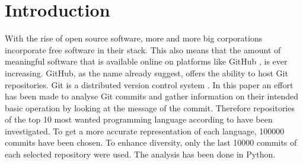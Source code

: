 \section{Introduction}
\label{sec:introduction}

With the rise of open source software, more and more big corporations
incorporate free software in their stack. This also means that the amount of
meaningful software that is available online on platforms like GitHub
\cite{github}, is ever increasing. GitHub, as the name already suggest, offers
the ability to host Git repositories. Git is a distributed version control
system \cite{git}. In this paper an effort has been made to analyse Git commits
and gather information on their intended basic operation by looking at the
message of the commit. Therefore repositories of the top 10 most wanted
programming language according to \cite{so-survey} have been investigated. To
get a more accurate representation of each language, 100000 commits have been
chosen. To enhance diversity, only the last 10000 commits of each selected
repository were used.  The analysis has been done in Python.

